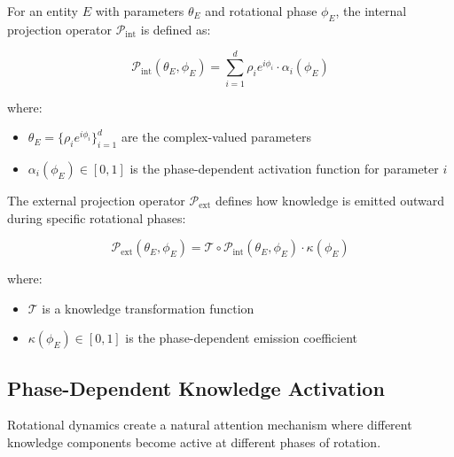 \begin{definition}
For an entity $E$ with parameters $\theta_E$ and rotational phase $\phi_E$, the internal projection operator $\mathcal{P}_{\text{int}}$ is defined as:

\begin{equation}
\mathcal{P}_{\text{int}}(\theta_E, \phi_E) = \sum_{i=1}^d \rho_i e^{i\phi_i} \cdot \alpha_i(\phi_E) 
\end{equation}

where:
\begin{itemize}
    \item $\theta_E = \{\rho_i e^{i\phi_i}\}_{i=1}^d$ are the complex-valued parameters
    \item $\alpha_i(\phi_E) \in [0,1]$ is the phase-dependent activation function for parameter $i$
\end{itemize}
\end{definition}

\begin{definition}
The external projection operator $\mathcal{P}_{\text{ext}}$ defines how knowledge is emitted outward during specific rotational phases:

\begin{equation}
\mathcal{P}_{\text{ext}}(\theta_E, \phi_E) = \mathcal{T} \circ \mathcal{P}_{\text{int}}(\theta_E, \phi_E) \cdot \kappa(\phi_E)
\end{equation}

where:
\begin{itemize}
    \item $\mathcal{T}$ is a knowledge transformation function
    \item $\kappa(\phi_E) \in [0,1]$ is the phase-dependent emission coefficient
\end{itemize}
\end{definition}

\subsection{Phase-Dependent Knowledge Activation}

Rotational dynamics create a natural attention mechanism where different knowledge components become active at different phases of rotation.

